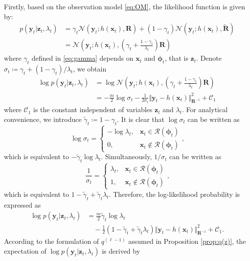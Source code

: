 \documentclass[10pt,twocolumn,twoside]{IEEEtran}
\newcommand{\cm}{\text{,}} %
\newcommand{\fs}{\text{.}} %
\newcommand{\x}{{ \bm{x} }}
\newcommand{\y}{{ \bm{y} }}
\newcommand{\z}{{ \bm{z} }}
\begin{document}
\begin{appendices}
Firstly, based on the observation model \eqref{eq:OM}, the likelihood function is given by:
\begin{equation*}
\begin{split}
    p(\y_t|\z_t,\lambda_t) &= \gamma_t\mathcal{N}(\y_t;h(\x_t),\bm{R})+(1-\gamma_t)\mathcal{N}(\y_t;h(\x_t),\tilde{\bm{R}}) \\
    &= \mathcal{N}(\y_t;h(\x_t),(\gamma_t+\tfrac{1-\gamma_t}{\lambda_t})\bm{R})
\end{split}
\end{equation*}
where $\gamma_t$ defined in \eqref{eq:gamma} depends on $\x_t$ and $\bm\phi_t$, that is $\z_t$. Denote $\sigma_t\coloneqq\gamma_t+(1-\gamma_t)/\lambda_t$, we obtain
\begin{equation*}
\begin{split}
    \log{p(\y_t|\z_t,\lambda_t)} &= \log\mathcal{N}(\y_t;h(\x_t),(\gamma_t+\tfrac{1-\gamma_t}{\lambda_t})\bm{R}) \\
    &= -\frac{m}{2}\log{\sigma_t} - \frac{1}{2\sigma_t}\Vert\y_t-h(\x_t)\Vert^2_{\bm{R}^{-1}} + \mathcal{C}_1
\end{split}
\end{equation*}
where $\mathcal{C}_1$ is the constant independent of variables $\z_t$ and $\lambda_t$. For analytical convenience, we introduce $\tilde\gamma_t\coloneqq1-\gamma_t$. It is clear that $\log\sigma_t$ can be written as
$$
\log\sigma_t = \begin{cases}
-\log\lambda_t, & \x_t \in \mathcal{R}(\bm\phi_t) \\
0, & \x_t \notin \mathcal{R}(\bm\phi_t)
\end{cases} \cm
$$
which is equivalent to $-\tilde\gamma_t\log\lambda_t$. Simultaneously, $1/\sigma_t$ can be written as
$$
\frac{1}{\sigma_t} = \begin{cases}
\lambda_t, & \x_t \in \mathcal{R}(\bm\phi_t) \\
1, & \x_t \notin \mathcal{R}(\bm\phi_t)
\end{cases} \cm
$$
which is equivalent to $1-\tilde\gamma_t+\tilde\gamma_t\lambda_t$. Therefore, the log-likelihood probability is expressed as
\begin{align}
\label{eq:log-likelihood}
    \log{p(\y_t|\z_t,\lambda_t)} &= \frac{m}{2}\tilde\gamma_t\log\lambda_t  \\
    &\quad- \frac{1}{2}(1-\tilde\gamma_t+\tilde\gamma_t\lambda_t)\Vert\y_t-h(\x_t)\Vert^2_{\bm{R}^{-1}} + \mathcal{C}_1 \fs \nonumber
\end{align}
According to the formulation of $q^{(\ell-1)}$ assumed in Proposition \ref{prop:q(z)}, the expectation of $\log{p(\y_t|\z_t,\lambda_t)}$ is derived by

\end{appendices}
\end{document}
